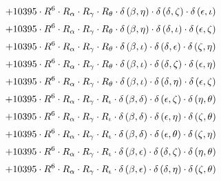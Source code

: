 \begin{subequations}
\begin{gather}
 \\[0.2em] \notag 		 + 10395 \cdot R^{6} \cdot R_{\alpha{}} \cdot R_{\gamma{}} \cdot R_{\theta{}} \cdot \delta{}\left(\beta{}, \eta{}\right) \cdot \delta{}\left(\delta{}, \zeta{}\right) \cdot \delta{}\left(\epsilon{}, \iota{}\right) 
 \\[0.2em] \notag 		 + 10395 \cdot R^{6} \cdot R_{\alpha{}} \cdot R_{\gamma{}} \cdot R_{\theta{}} \cdot \delta{}\left(\beta{}, \eta{}\right) \cdot \delta{}\left(\delta{}, \iota{}\right) \cdot \delta{}\left(\epsilon{}, \zeta{}\right) 
 \\[0.2em] \notag 		 + 10395 \cdot R^{6} \cdot R_{\alpha{}} \cdot R_{\gamma{}} \cdot R_{\theta{}} \cdot \delta{}\left(\beta{}, \iota{}\right) \cdot \delta{}\left(\delta{}, \epsilon{}\right) \cdot \delta{}\left(\zeta{}, \eta{}\right) 
 \\[0.2em] \notag 		 + 10395 \cdot R^{6} \cdot R_{\alpha{}} \cdot R_{\gamma{}} \cdot R_{\theta{}} \cdot \delta{}\left(\beta{}, \iota{}\right) \cdot \delta{}\left(\delta{}, \zeta{}\right) \cdot \delta{}\left(\epsilon{}, \eta{}\right) 
 \\[0.2em] \notag 		 + 10395 \cdot R^{6} \cdot R_{\alpha{}} \cdot R_{\gamma{}} \cdot R_{\theta{}} \cdot \delta{}\left(\beta{}, \iota{}\right) \cdot \delta{}\left(\delta{}, \eta{}\right) \cdot \delta{}\left(\epsilon{}, \zeta{}\right) 
 \\[0.2em] \notag 		 + 10395 \cdot R^{6} \cdot R_{\alpha{}} \cdot R_{\gamma{}} \cdot R_{\iota{}} \cdot \delta{}\left(\beta{}, \delta{}\right) \cdot \delta{}\left(\epsilon{}, \zeta{}\right) \cdot \delta{}\left(\eta{}, \theta{}\right) 
 \\[0.2em] \notag 		 + 10395 \cdot R^{6} \cdot R_{\alpha{}} \cdot R_{\gamma{}} \cdot R_{\iota{}} \cdot \delta{}\left(\beta{}, \delta{}\right) \cdot \delta{}\left(\epsilon{}, \eta{}\right) \cdot \delta{}\left(\zeta{}, \theta{}\right) 
 \\[0.2em] \notag 		 + 10395 \cdot R^{6} \cdot R_{\alpha{}} \cdot R_{\gamma{}} \cdot R_{\iota{}} \cdot \delta{}\left(\beta{}, \delta{}\right) \cdot \delta{}\left(\epsilon{}, \theta{}\right) \cdot \delta{}\left(\zeta{}, \eta{}\right) 
 \\[0.2em] \notag 		 + 10395 \cdot R^{6} \cdot R_{\alpha{}} \cdot R_{\gamma{}} \cdot R_{\iota{}} \cdot \delta{}\left(\beta{}, \epsilon{}\right) \cdot \delta{}\left(\delta{}, \zeta{}\right) \cdot \delta{}\left(\eta{}, \theta{}\right) 
 \\[0.2em] \notag 		 + 10395 \cdot R^{6} \cdot R_{\alpha{}} \cdot R_{\gamma{}} \cdot R_{\iota{}} \cdot \delta{}\left(\beta{}, \epsilon{}\right) \cdot \delta{}\left(\delta{}, \eta{}\right) \cdot \delta{}\left(\zeta{}, \theta{}\right) 

\end{gather}
\end{subequations}

